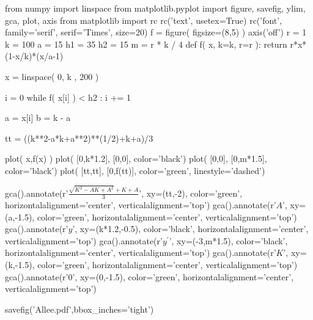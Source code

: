 \documentclass[12pt,twoside,a4paper]{article}
\begin{document}
\begin{pycode}
from numpy import linspace
from matplotlib.pyplot import figure, savefig, ylim, gca, plot, axis
from matplotlib import rc
rc('text', usetex=True)
rc('font', family='serif', serif='Times', size=20)
f = figure( figsize=(8,5) )
axis('off')
r = 1
k = 100
a = 15
h1 = 35
h2 = 15
m = r * k / 4
def f( x, k=k, r=r ):
    return r*x*(1-x/k)*(x/a-1)

x   = linspace( 0, k , 200 )

i = 0
while f( x[i] ) < h2  : 
    i += 1
    
a = x[i]
b = k - a

tt = ((k**2-a*k+a**2)**(1/2)+k+a)/3



plot( x,f(x) )
plot(  [0,k*1.2], [0,0], color='black')
plot(  [0,0], [0,m*1.5], color='black')
plot( [tt,tt], [0,f(tt)], color='green', linestyle='dashed')

gca().annotate(r'$\frac{\sqrt{K^2-AK+A^2}+K+A}{3}$', 
                    xy=(tt,-2), 
                    color='green', 
                    horizontalalignment='center',  
                    verticalalignment='top')
gca().annotate(r'$A$', 
                    xy=(a,-1.5), 
                    color='green', 
                    horizontalalignment='center',  
                    verticalalignment='top')
gca().annotate(r'$y$',
                    xy=(k*1.2,-0.5), 
                    color='black', 
                    horizontalalignment='center',  
                    verticalalignment='top')
gca().annotate(r'$y^\prime$', 
                    xy=(-3,m*1.5), 
                    color='black', 
                    horizontalalignment='center',  
                    verticalalignment='top')
gca().annotate(r'$K$', 
                    xy=(k,-1.5), 
                    color='green',
                    horizontalalignment='center',  
                    verticalalignment='top')
gca().annotate(r'$0$', 
                    xy=(0,-1.5), 
                    color='green', 
                    horizontalalignment='center',  
                    verticalalignment='top')

savefig('Allee.pdf',bbox_inches='tight')
\end{pycode}
\end{document}
